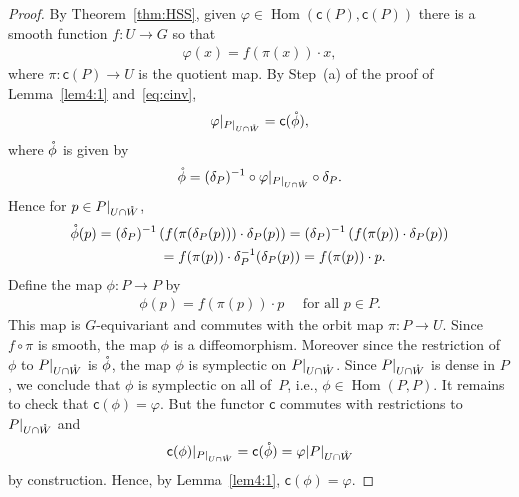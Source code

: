 \documentclass[pdftex]{sigma}
\numberwithin{equation}{section}
\begin{document}
\begin{proof}
  By Theorem~\ref{thm:HSS}, given $\varphi\in \operatorname{Hom}({\textsf{c}}(P),{\textsf{c}}(P))$ there
  is a smooth function $f\colon U\to G$ so that
\begin{gather*}
\varphi(x) = f(\pi(x))\cdot x,
\end{gather*}
where $\pi\colon {\textsf{c}}(P)\to U$ is the quotient map.  By Step~(a) of the proof
of Lemma~\ref{lem4:1} and~\eqref{eq:cinv},
\begin{gather*}
\varphi|_{P|_{U\cap {\mathaccent23{W}}}} = {\textsf{c}} ({\mathaccent23{\phi}}),
\end{gather*}
where ${\mathaccent23{\phi}}$ is given by
\begin{gather*}
{\mathaccent23{\phi}}= (\delta_P)^{-1} \circ \varphi|_{P|_{U\cap {\mathaccent23{W}}}} \circ \delta_P.
\end{gather*}
Hence for $p\in P|_{U\cap {\mathaccent23{W}}}$,
\begin{gather*}
{\mathaccent23{\phi}}(p) = (\delta_P)^{-1} \left(f (\pi(\delta_P (p)))\cdot
  \delta_P(p)\right)= (\delta_P)^{-1} \left(f(\pi(p))\cdot
  \delta_P(p)\right)\\
\hphantom{{\mathaccent23{\phi}}(p)}{}
= f(\pi(p))\cdot \delta_P^{-1} (\delta_P(p)) =
f(\pi(p))\cdot p.
\end{gather*}
Def\/ine the map $\phi\colon P\to P$ by
\begin{gather*}
\phi(p) = f(\pi(p))\cdot p\quad \textrm{ for all }p\in P.
\end{gather*}
This map is $G$-equivariant and commutes with the orbit map $\pi\colon P\to
U$.  Since $f \circ \pi$ is smooth, the map $\phi$ is a
dif\/feomorphism.  Moreover since the restriction of $\phi$ to $P|_{U\cap {\mathaccent23{W}}}$ is
${\mathaccent23{\phi}}$, the map $\phi$ is symplectic on $P|_{U\cap {\mathaccent23{W}}}$.  Since
$P|_{U\cap {\mathaccent23{W}}}$ is dense in $P$, we conclude that $\phi$ is symplectic
on all of~$P$, i.e., $\phi\in \operatorname{Hom}(P,P)$.  It remains to check that ${\textsf{c}}(\phi) =
\varphi$.  But the functor ${\textsf{c}}$ commutes with restrictions to
$P|_{U\cap {\mathaccent23{W}}}$ and
\begin{gather*}
{\textsf{c}}(\phi)|_{P|_{U\cap {\mathaccent23{W}}}} = {\textsf{c}}({\mathaccent23{\phi}}) = \varphi|{P|_{U\cap {\mathaccent23{W}}}}
\end{gather*}
by construction.  Hence, by Lemma~\ref{lem4:1}, ${\textsf{c}}(\phi) = \varphi$.
\end{proof}
\end{document}
